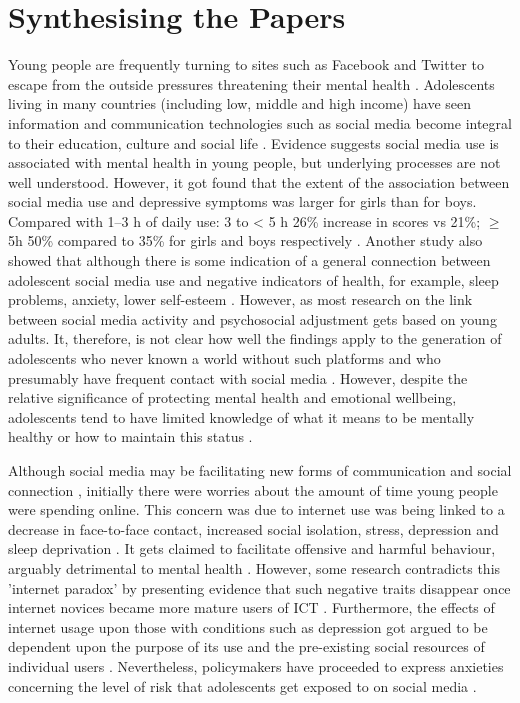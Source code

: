 \documentclass{sigchi}
\begin{document}
\section{Synthesising the Papers}
	Young people are frequently turning to sites such as Facebook and Twitter to escape from the outside pressures threatening their mental health \cite{boyd2014s}. Adolescents living in many countries (including low, middle and high income) have seen information and communication technologies such as social media become integral to their education, culture and social life \cite{allen2014social, van2013culture}. Evidence suggests social media use is associated with mental health in young people, but underlying processes are not well understood. However, it got found that the extent of the association between social media use and depressive symptoms was larger for girls than for boys. Compared with 1–3 h of daily use: 3 to < 5 h 26\% increase in scores vs 21\%; $\geq$ 5h 50\% compared to 35\% for girls and boys respectively \cite{kelly2018social}. Another study also showed that although there is some indication of a general connection between adolescent social media use and negative indicators of health, for example, sleep problems, anxiety, lower self-esteem \cite{underwood2017power, scott2018fear}. However, as most research on the link between social media activity and psychosocial adjustment gets based on young adults. It, therefore, is not clear how well the findings apply to the generation of adolescents who never known a world without such platforms and who presumably have frequent contact with social media \cite{barry2017adolescent}. However, despite the relative significance of protecting mental health and emotional wellbeing, adolescents tend to have limited knowledge of what it means to be mentally healthy or how to maintain this status \cite{dogra2012nigerian}.
	
	Although social media may be facilitating new forms of communication and social connection \cite{baker2008blogging}, initially there were worries about the amount of time young people were spending online. This concern was due to internet use was being linked to a decrease in face-to-face contact, increased social isolation, stress, depression and sleep deprivation \cite{kraut1998internet, espinoza2011pervasiveness}. It gets claimed to facilitate offensive and harmful behaviour, arguably detrimental to mental health \cite{mesch2009parental}. However, some research contradicts this 'internet paradox' \cite{o2018social} by presenting evidence that such negative traits disappear once internet novices became more mature users of ICT \cite{kraut2002internet}. Furthermore, the effects of internet usage upon those with conditions such as depression got argued to be dependent upon the purpose of its use and the pre-existing social resources of individual users \cite{bessiere2008effects}. Nevertheless, policymakers have proceeded to express anxieties concerning the level of risk that adolescents get exposed to on social media \cite{boyd2014s}.
	
\end{document}
